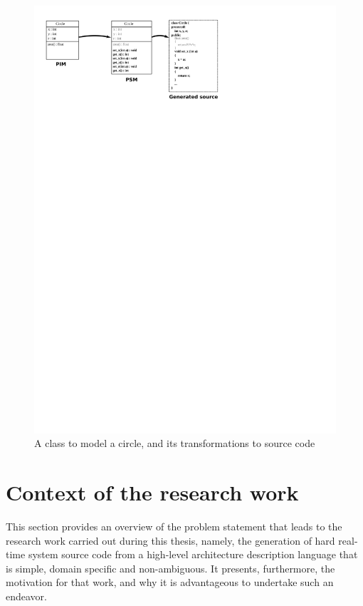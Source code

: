 \begin{figure}
\centering
\includegraphics{figs/class}
\caption{A class to model a circle, and its transformations to source
  code}
\label{fig:class}
\end{figure}

\section{Context of the research work}
This section provides an overview of the problem statement that leads
to the research work carried out during this thesis, namely, the
generation of hard real-time system source code from a high-level
architecture description language that is simple, domain specific and
non-ambiguous. It presents, furthermore, the motivation for that work,
and why it is advantageous to undertake such an endeavor.

